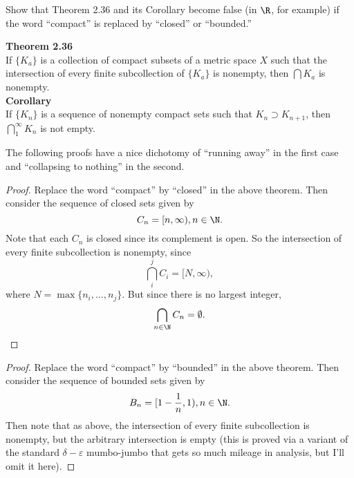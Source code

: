 \documentclass{assignment}
\begin{document}
\begin{question}[2.15]
  Show that Theorem 2.36 and its Corollary become false (in $\R$, for example) if the word
``compact'' is replaced by ``closed'' or ``bounded.''
\end{question}
\begin{displayquote}
  \textbf{Theorem 2.36} \\
  If $\{K_a\}$ is a collection of compact subsets of a metric space $X$ such that the intersection of
every finite subcollection of $\{K_a\}$ is nonempty, then $\bigcap K_a$ is nonempty. \\

  \textbf{Corollary}\\
If $\{K_n\}$ is a sequence of nonempty compact sets such that $K_n \supset K_{n+1}$, then $\bigcap_1
^\infty K_n$ is not empty.  
\end{displayquote}
The following proofs have a nice dichotomy of ``running away'' in the first case and ``collapsing to
nothing'' in the second.
\begin{proof}
  Replace the word ``compact'' by ``closed'' in the above theorem. Then consider the sequence of closed
  sets given by $$C_n = [n, \infty), n\in\N.$$ Note that each $C_n$ is closed since its complement is 
  open. So the intersection of every finite subcollection is nonempty, since $$\bigcap_i^j C_i = 
  [N, \infty),$$ where $N = \max\{n_i,\ldots,n_j\}$. But since there is no largest integer, 
    $$\bigcap_{n\in\N}C_n = \emptyset.$$
\end{proof}
\begin{proof}
  Replace the word ``compact'' by ``bounded'' in the above theorem. Then consider the sequence of 
  bounded sets given by $$B_n = [1 - \frac{1}{n}, 1), n\in\N.$$ Then note that as above, the intersection
  of every finite subcollection is nonempty, but the arbitrary intersection is empty (this is proved
  via a variant of the standard $\delta-\varepsilon$ mumbo-jumbo that gets so much mileage in analysis,
  but I'll omit it here).
\end{proof}
\end{document}
